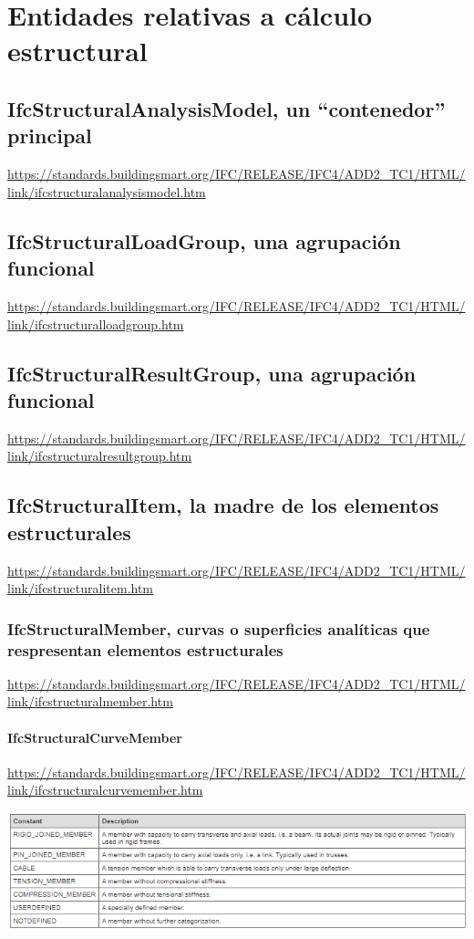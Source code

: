 \documentclass[spanish,12pt,a4paper,final,oneside]{book}
\begin{document}
\chapter{Entidades relativas a cálculo estructural}

\section{IfcStructuralAnalysisModel, un ``contenedor'' principal}
\url{https://standards.buildingsmart.org/IFC/RELEASE/IFC4/ADD2_TC1/HTML/link/ifcstructuralanalysismodel.htm}


\section{IfcStructuralLoadGroup, una agrupación funcional}
\url{https://standards.buildingsmart.org/IFC/RELEASE/IFC4/ADD2_TC1/HTML/link/ifcstructuralloadgroup.htm}

\section{IfcStructuralResultGroup, una agrupación funcional}
\url{https://standards.buildingsmart.org/IFC/RELEASE/IFC4/ADD2_TC1/HTML/link/ifcstructuralresultgroup.htm}

\section{IfcStructuralItem, la madre de los elementos estructurales}
\url{https://standards.buildingsmart.org/IFC/RELEASE/IFC4/ADD2_TC1/HTML/link/ifcstructuralitem.htm}

\subsection{IfcStructuralMember, curvas o superficies analíticas que respresentan elementos estructurales}
\url{https://standards.buildingsmart.org/IFC/RELEASE/IFC4/ADD2_TC1/HTML/link/ifcstructuralmember.htm}

\subsubsection{IfcStructuralCurveMember}
\url{https://standards.buildingsmart.org/IFC/RELEASE/IFC4/ADD2_TC1/HTML/link/ifcstructuralcurvemember.htm}

\includegraphics[width=\textwidth]{Definicion de IfcStructuralCurveMemberTypeEnum}
\end{document}
